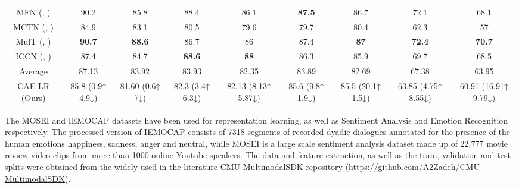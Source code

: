 \begin{table*}
{\begin{tabular}{ccccccccc}
{ MFN (\cite{zadeh2018memory}, \cite{wang2019words})}              & { 90.2}             & { 85.8}                & { 88.4}            & { 86.1}                & { \textbf{87.5}}   & { 86.7}                & { 72.1}               & { 68.1}                \\
{ MCTN (\cite{pham2019found}, \cite{tsai2019multimodal})}          & { 84.9}             & { 83.1}                & { 80.5}            & { 79.6}                & { 79.7}            & { 80.4}                & { 62.3}               & { 57}                \\
{ MulT (\cite{tsai2019multimodal}, \cite{tsai2019multimodal})}     & { \textbf{90.7}}    & { \textbf{88.6}}       & { 86.7}            & { 86}                & { 87.4}            & { \textbf{87}}       & { \textbf{72.4}}      & { \textbf{70.7}}       \\
{ ICCN (\cite{sun2020learning}, \cite{sun2020learning})}           & { 87.4}             & { 84.7}                & { \textbf{88.6}}   & { \textbf{88}}       & { 86.3}            & { 85.9}                & { 69.7}               & { 68.5}                \\
\hline
{ Average}                                                         & { 87.13}             & { 83.92}                & { 83.93}            & { 82.35}                & { 83.89}            & { 82.69}                & { 67.38}               & { 63.95}                \\ \hline
{ CAE-LR (Ours)}                                                   & { 85.8  (0.9↑ 4.9↓)} & { 81.60 (0.6↑ 7↓)}      & { 82.3 (3.4↑ 6.3↓)} & { 82.13 (8.13↑ 5.87↓)}  & { 85.6 (9.8↑ 1.9↓)} & { 85.5 (20.1↑ 1.5↓)}    & { 63.85 (4.75↑ 8.55↓)} & { 60.91 (16.91↑ 9.79↓)}
\end{tabular}}
\end{table*}


The MOSEI \cite{zadeh2018multimodal} and IEMOCAP \cite{busso2008iemocap}  datasets have been used for representation learning, as well as Sentiment Analysis and Emotion Recognition respectively. The processed version of IEMOCAP consists of 7318 segments of recorded dyadic dialogues annotated for the presence of the human emotions happiness, sadness, anger and neutral, while MOSEI is a large scale sentiment analysis dataset made up of 22,777 movie review video clips from more than 1000 online Youtube speakers. The data and feature extraction, as well as the train, validation and test splits were obtained from the widely used in the literature CMU-MultimodalSDK repository (\href{https://github.com/A2Zadeh/CMU-MultimodalSDK}{https://github.com/A2Zadeh/CMU-MultimodalSDK}). 

